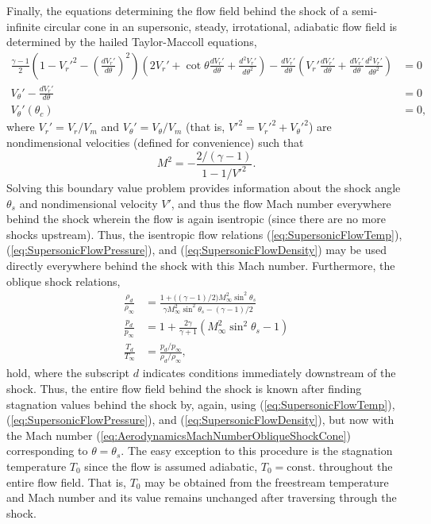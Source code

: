 \documentclass[11pt,dvipsnames]{thesis}
\begin{document}
Finally, the equations determining the flow field behind the shock of a semi-infinite circular cone in an supersonic, steady, irrotational, adiabatic flow field is determined by the hailed Taylor-Maccoll equations,
\begin{align}
\!\!\!\frac{\gamma - 1}{2}\left(1 - {V_r'}^2 - \left(\frac{d V_r'}{d\theta}\right)^{\!2}\right) \left(2 V_r' + \cot\theta \frac{d V_r'}{d\theta} + \frac{d^2 V_r'}{d\theta^2}\right) - \frac{d V_r'}{d\theta}\left(V_r'\frac{d V_r'}{d\theta} + \frac{d V_r'}{d\theta} \frac{d^2 V_r'}{d\theta^2}\right) &= 0 \\
V_\theta' - \frac{d V_r'}{d\theta} &= 0 \\
V_\theta'(\theta_c) &= 0,
\end{align}
where $V_r' = V_r / V_m$ and $V_\theta' = V_\theta / V_m$ (that is, ${V'}^2 = {V_r'}^2 + {V_\theta'}^2$) are nondimensional velocities (defined for convenience) such that 
\begin{equation}
M^2 = -\frac{2 / (\gamma - 1)}{1 - 1/{V'}^2}. \label{eq:AerodynamicsMachNumberObliqueShockCone}
\end{equation}
Solving this boundary value problem provides information about the shock angle $\theta_s$ and nondimensional velocity $V'$, and thus the flow Mach number everywhere behind the shock wherein the flow is again isentropic (since there are no more shocks upstream). Thus, the isentropic flow relations (\ref{eq:SupersonicFlowTemp}), (\ref{eq:SupersonicFlowPressure}), and (\ref{eq:SupersonicFlowDensity}) may be used directly everywhere behind the shock with this Mach number. Furthermore, the oblique shock relations,
\begin{align}
\frac{\rho_d}{\rho_\infty} &= \frac{1 + \big((\gamma - 1)/2\big) M_\infty^2 \sin^2\theta_s}{\gamma M_\infty^2 \sin^2\theta_s - (\gamma - 1)/2} \label{eq:AerodynamicsObliqueShockrho} \\
\frac{p_d}{p_\infty} &= 1 + \frac{2\gamma}{\gamma + 1}(M_\infty^2 \sin^2\theta_s - 1) \label{eq:AerodynamicsObliqueShockp} \\
\frac{T_d}{T_\infty} &= \frac{p_d/p_\infty}{\rho_d/\rho_\infty}, \label{eq:AerodynamicsObliqueShockT}
\end{align}
hold, where the subscript $d$ indicates conditions immediately downstream of the shock. Thus, the entire flow field behind the shock is known after finding stagnation values behind the shock by, again, using (\ref{eq:SupersonicFlowTemp}), (\ref{eq:SupersonicFlowPressure}), and (\ref{eq:SupersonicFlowDensity}), but now with the Mach number (\ref{eq:AerodynamicsMachNumberObliqueShockCone}) corresponding to $\theta = \theta_s$.
The easy exception to this procedure is the stagnation temperature $T_0$ since the flow is assumed adiabatic, $T_0 = \mathrm{const.}$ throughout the entire flow field. That is, $T_0$ may be obtained from the freestream temperature and Mach number and its value remains unchanged after traversing through the shock.
\end{document}
